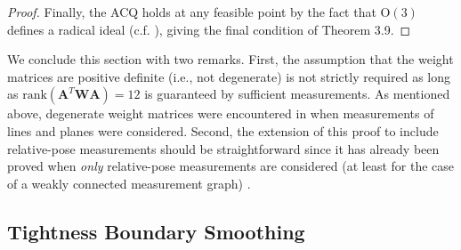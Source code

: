 \documentclass[lettersize,journal]{IEEEtran}
\newcommand{\rank}[1]{\mbox{rank}\left(#1\right)}
\begin{document}
\begin{proof}
Finally, the ACQ holds at any feasible point by the fact that $\mbox{O}(3)$ defines a radical ideal (c.f. \cite{wiseCertifiablyOptimalMonocular2020,cifuentesLocalStabilitySemidefinite2022}), giving the final condition of Theorem 3.9.
\end{proof}

We conclude this section with two remarks. First, the assumption that the weight matrices are positive definite (i.e., not degenerate) is not strictly required as long as $\rank{\bm{A}^T \bm{W} \bm{A}}=12$ is guaranteed by sufficient measurements. As mentioned above, degenerate weight matrices were encountered in \cite{brialesConvexGlobal3D2017} when measurements of lines and planes were considered. Second, the extension of this proof to include relative-pose measurements should be straightforward since it has already been proved when \emph{only} relative-pose measurements are considered (at least for the case of a weakly connected measurement graph) \cite{rosenSESyncCertifiablyCorrect2019}.

\subsection{Tightness Boundary Smoothing}\label{SM:Smoothing}
\end{document}
